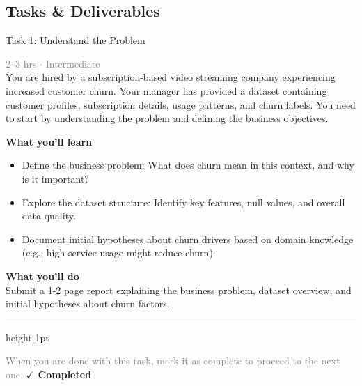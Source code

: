 \documentclass[10pt,a4paper]{article}
\begin{document}
\subsection*{Tasks \& Deliverables}

\begin{taskbox}{Task 1: Understand the Problem}

    {\small \textcolor{gray}{2--3 hrs $\cdot$ Intermediate}}\\[12pt]

      
You are hired by a subscription-based video streaming company experiencing increased customer churn. Your manager has provided a dataset containing customer profiles, subscription details, usage patterns, and churn labels. You need to start by understanding the problem and defining the business objectives.


\vspace{8pt}
{\large \textbf{\textcolor{brandLight}{What you'll learn}}}\\[4pt]  
\begin{itemize}
    \item Define the business problem: What does churn mean in this context, and why is it important?  
    \item Explore the dataset structure: Identify key features, null values, and overall data quality.  
    \item Document initial hypotheses about churn drivers based on domain knowledge (e.g., high service usage might reduce churn).  
\end{itemize}

\vspace{8pt}
{\large \textbf{\textcolor{brandLight}{What you'll do}}}\\[4pt]  
Submit a 1-2 page report explaining the business problem, dataset overview, and initial hypotheses about churn factors.\par

    \vspace{16pt}

    \textcolor{cardBorder}{\hrule height 1pt}\vspace{8pt}

    \small \textcolor{gray}{When you are done with this task, mark it as complete to proceed to the next one.} \hfill \textbf{\textcolor{brandDark}{$\checkmark$ Completed}}

\end{taskbox}
\end{document}

